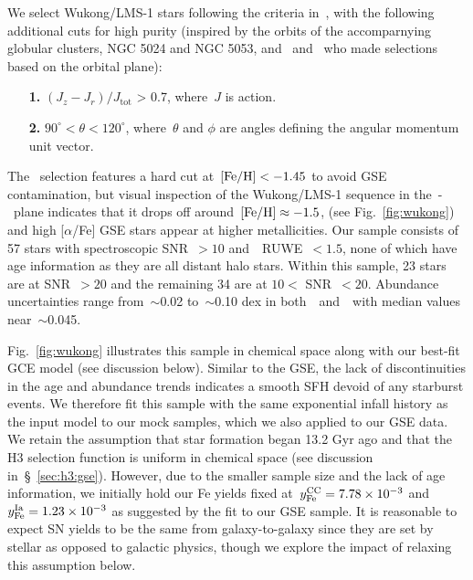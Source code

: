 \documentclass[foo.tex]{subfiles}
\begin{document}
We select Wukong/LMS-1 stars following the criteria in~\citet{Naidu2020}, with
the following additional cuts for high purity (inspired by the orbits of the
accomparnying globular clusters, NGC 5024 and NGC 5053, and~\citealt{Yuan2020}
and~\citealt{Malhan2021} who made selections based on the orbital plane):
\begin{itemize}

	\item[\textbf{1.}] $(J_z - J_r) / J_\text{tot}$ > 0.7, where~$J$ is action.

	\item[\textbf{2.}] $90^\circ < \theta < 120^\circ$, where~$\theta$ and
	$\phi$ are angles defining the angular momentum unit vector.

\end{itemize}
The~\citet{Naidu2020} selection features a hard cut at~$\text{[Fe/H]} < -1.45$ to avoid
GSE contamination, but visual inspection of the Wukong/LMS-1 sequence in
the~\afe-\feh~plane indicates that it drops off around~$\text{[Fe/H]} \approx -1.5$,
(see Fig.~\ref{fig:wukong}) and high [$\alpha$/Fe] GSE stars appear at higher
metallicities.
Our sample consists of 57 stars with spectroscopic SNR~$> 10$
and~\gaia~RUWE~$< 1.5$, none of which have age information as they are all
distant halo stars.
Within this sample, 23 stars are at SNR~$> 20$ and the remaining 34 are at
$10 <$ SNR~$< 20$.
Abundance uncertainties range from~$\sim$0.02 to~$\sim$0.10 dex in
both~\afe~and~\feh~with median values near~$\sim$0.045.
\par
Fig.~\ref{fig:wukong} illustrates this sample in chemical space along with our
best-fit GCE model (see discussion below).
Similar to the GSE, the lack of discontinuities in the age and abundance trends
indicates a smooth SFH devoid of any starburst events.
We therefore fit this sample with the same exponential infall history as the
input model to our mock samples, which we also applied to our GSE data.
We retain the assumption that star formation began 13.2 Gyr ago and that the H3
selection function is uniform in chemical space (see discussion
in~\S~\ref{sec:h3:gse}).
However, due to the smaller sample size and the lack of age information, we
initially hold our Fe yields fixed at~$y_\text{Fe}^\text{CC} = 7.78\times10^{-3}$ and
$y_\text{Fe}^\text{Ia} = 1.23\times10^{-3}$ as suggested by the fit to our GSE sample.
It is reasonable to expect SN yields to be the same from galaxy-to-galaxy since
they are set by stellar as opposed to galactic physics, though we explore the
impact of relaxing this assumption below.
\par
\end{document}
